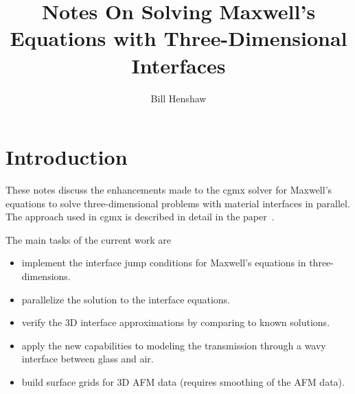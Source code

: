 \documentclass[11pt]{article}
\begin{document}
 
\title{Notes On Solving Maxwell's Equations with Three-Dimensional Interfaces}

\author{
Bill Henshaw \\
}
 
\maketitle

\tableofcontents

\section{Introduction}

These notes discuss the enhancements made to the cgmx solver for Maxwell's equations
to solve three-dimensional problems with material interfaces in parallel. 
The approach used in cgmx is described in detail in the paper~\cite{max2006b}.

The main tasks of the current work are
\begin{itemize}
  \item implement the interface jump conditions for Maxwell's equations in three-dimensions.
  \item parallelize the solution to the interface equations.
  \item verify the 3D interface approximations by comparing to known solutions.
  \item apply the new capabilities to modeling the transmission through a wavy interface between glass and air.
  \item build surface grids for 3D AFM data (requires smoothing of the AFM data).
\end{itemize}
\end{document}
